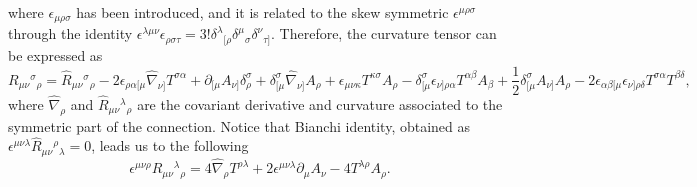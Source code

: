\documentclass[twocolumn,
  showpacs,showkeys,prd,superscriptaddress]{revtex4-1}
\begin{document}
where  $\epsilon_{\mu\rho\sigma}$ has been introduced, and it is related to the skew symmetric $\epsilon^{\mu\rho\sigma}$ through the identity $\epsilon^{\lambda\mu\nu}\epsilon_{\rho\sigma\tau}=3!\delta^{\lambda}{}_{[\rho}\delta^\mu{}_{\sigma}\delta^{\nu}{}_{\tau]}$. Therefore, the curvature tensor can be expressed as 
\begin{dmath}[compact, spread=2pt]
  \label{RiemmanDecomposition}
  R_{\mu\nu}{}^\sigma{}_\rho=
  \hat{R}_{\mu\nu}{}^\sigma{}_\rho
  -2\epsilon_{\rho\alpha[\mu}\hat\nabla_{\nu]}T^{\sigma\alpha}
  +\partial_{[\mu}A_{\nu]}\delta^\sigma_\rho
  +\delta^\sigma_{[\mu}\hat\nabla_{\nu]}A_\rho
  +\epsilon_{\mu\nu\kappa}T^{\kappa\sigma}A_\rho
  -\delta^\sigma_{[\mu}\epsilon_{\nu]\rho\alpha}T^{\alpha\beta}A_\beta 
  +\frac{1}{2}\delta^\sigma_{[\mu}A_{\nu]}A_\rho
  -2\epsilon_{\alpha\beta[\mu}\epsilon_{\nu]\rho\delta}T^{\sigma\alpha}T^{\beta\delta},
\end{dmath}
where $ \hat\nabla_\rho$ and $\hat{R}_{\mu\nu}{}^\lambda{}_\rho$ are the covariant derivative and  curvature associated to the symmetric part of the connection.
Notice that Bianchi identity, obtained as $\epsilon^{\mu\nu\lambda}\hat R_{\mu\nu}{}^\rho{}_\lambda=0$, leads us to the following
\begin{equation}
 \label{bianchi}
 \epsilon^{\mu\nu\rho} R_{\mu\nu}{}^\lambda{}_\rho = 4\hat\nabla_\rho T^{\rho\lambda}
+2\epsilon^{\mu\nu\lambda}\partial_\mu A_\nu-4T^{\lambda\rho}A_\rho. 
\end{equation}
\end{document}

